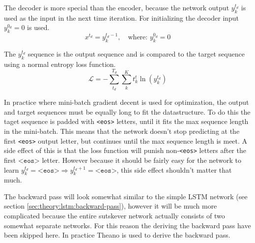 The decoder is more special than the encoder, because the network output $y_k^{t_d}$ is used as the input in the next time iteration. For initializing the decoder input $y_k^{0_d} = 0$ is used.
\begin{equation}
x^{t_d} = y_k^{t_d - 1}, \quad \text{where: } y_k^{0_d} = 0
\end{equation}

The $y_k^{t_d}$ sequence is the output sequence and is compared to the target sequence using a normal entropy loss function.
\begin{equation}
\mathcal{L} = - \sum_{t_d}^{T_d} \sum_{k}^K t_k^t \ln(y_k^{t_d})
\end{equation}

In practice where mini-batch gradient decent is used for optimization, the output and target sequences must be equally long to fit the datastructure. To do this the taget sequence is padded with \texttt{<eos>} letters, until it fits the max sequence length in the mini-batch. This means that the network doesn't stop predicting at the first \texttt{<eos>} output letter, but continues until the max sequence length is meet. A side effect of this is that the loss function will punish non-\texttt{<eos>} letters after the first $\texttt{<eos>}$ letter. However because it should be fairly easy for the network to learn $y_k^{t_d} = \texttt{<eos>} \Rightarrow y_k^{t_d+1} = \texttt{<eos>}$, this side effect shouldn't matter that much.

The backward pass will look somewhat similar to the simple LSTM network (see section \ref{sec:theory:lstm:backward-pass}), however it will be much more complicated because the entire sutskever network actually consists of two somewhat separate networks. For this reason the deriving the backward pass have been skipped here. In practice Theano \cite{theano-a, theano-b} is used to derive the backward pass.


